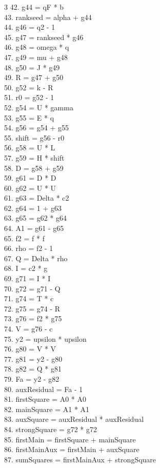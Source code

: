 \documentclass[10pt]{article}
\begin{document}
\begin{multicols}{3}
42. g44 = qF * b\\
43. rankseed = alpha + g44\\
44. g46 = q2 - 1\\
45. g47 = rankseed * g46\\
46. g48 = omega * q\\
47. g49 = mu + g48\\
48. g50 = J * g49\\
49. R = g47 + g50\\
50. g52 = k - R\\
51. r0 = g52 - 1\\
52. g54 = U * gamma\\
53. g55 = E * q\\
54. g56 = g54 + g55\\
55. shift = g56 - r0\\
56. g58 = U * L\\
57. g59 = H * shift\\
58. D = g58 + g59\\
59. g61 = D * D\\
60. g62 = U * U\\
61. g63 = Delta * c2\\
62. g64 = 1 + g63\\
63. g65 = g62 * g64\\
64. A1 = g61 - g65\\
65. f2 = f * f\\
66. rho = f2 - 1\\
67. Q = Delta * rho\\
68. I = c2 * g\\
69. g71 = I * I\\
70. g72 = g71 - Q\\
71. g74 = T * c\\
72. g75 = g74 - R\\
73. g76 = f2 * g75\\
74. V = g76 - c\\
75. y2 = upsilon * upsilon\\
76. g80 = V * V\\
77. g81 = y2 - g80\\
78. g82 = Q * g81\\
79. Fa = y2 - g82\\
80. auxResidual = Fa - 1\\
81. firstSquare = A0 * A0\\
82. mainSquare = A1 * A1\\
83. auxSquare = auxResidual * auxResidual\\
84. strongSquare = g72 * g72\\
85. firstMain = firstSquare + mainSquare\\
86. firstMainAux = firstMain + auxSquare\\
87. sumSquares = firstMainAux + strongSquare\\
\end{multicols}
\end{document}
